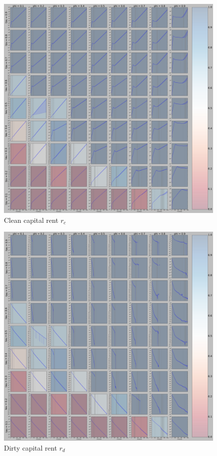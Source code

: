 \begin{figure}[H]
	\centering
	\includegraphics[width = \linewidth]{figures/K_c_r'b_r'=1o0.pdf}
	\caption{Clean capital rent $r_c$}
	\label{r_c}
\end{figure}

\begin{figure}[H]
	\centering
	\includegraphics[width = \linewidth]{figures/K_d_r'b_r'=1o0.pdf}
	\caption{Dirty capital rent $r_d$}
	\label{r_d}
\end{figure}

